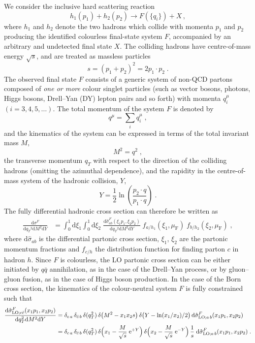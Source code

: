 \documentclass[12pt]{article}
\DeclareRobustCommand{\nn}{\nonumber}
\DeclareRobustCommand{\muf}{\ensuremath{\mu_{\mathrm{F}}}\xspace}
\DeclareRobustCommand{\qt}{\ensuremath{q_T}\xspace}
\DeclareRobustCommand{\rd}{\ensuremath{\mathrm{d}}}
\DeclareRobustCommand{\re}{\ensuremath{\mathrm{e}}}
\DeclareRobustCommand{\LO}{\text{LO}\xspace}
\begin{document}
We consider the inclusive hard scattering reaction 
\begin{equation}
  h_1(p_1)+h_2(p_2)\to F(\{q_i\})+X\, ,
  \label{class}
\end{equation}
where $h_1$ and $h_2$ denote the two hadrons which collide with momenta $p_1$ and $p_2$ producing the identified colourless final-state system $F$, accompanied by an arbitrary and undetected final state $X$. The colliding hadrons have centre-of-mass energy $\sqrt s$, and are treated as massless particles 
$$s= (p_1+p_2)^2 = 2p_1\cdot p_2 \;.$$ 
The observed final state $F$ consists of a generic system of non-QCD partons composed of \emph{one or more} colour singlet particles (such as vector bosons, photons, Higgs bosons, Drell--Yan (DY) lepton pairs and so forth) with momenta $q_i^{\mu}$ $(i=3,4,5,\dots)$. The total momentum of the system $F$ is denoted by 
$$q^{\mu}=\sum_i q_i^\mu \;,$$
and the kinematics of the system can be expressed in terms of the total invariant mass $M$, 
$$M^2=q^2 \;,$$ 
the transverse momentum $\qt$ with respect to the direction of the colliding hadrons (omitting the azimuthal dependence), and the rapidity in the centre-of-mass system of the hadronic collision, $Y$, 
$$Y = \frac{1}{2} \ln \left(\frac{p_2\cdot q}{p_1\cdot q}\right) \;.$$ 
The fully differential hadronic cross section can therefore be written as 
\begin{align}
  \frac{\rd\sigma^{F}}{\rd\qt^2\rd M^2\rd Y}
  &=
  \int_0^1\rd \xi_1 \int_0^1\rd \xi_2 \; 
  \frac{\rd\hat{\sigma}^{F}_{ab}(\xi_1 p_1, \xi_2 p_2)}{\rd\qt^2\rd M^2\rd Y} \;
  f_{a/h_1}(\xi_1,\muf) \; f_{b/h_2}(\xi_2,\muf) \;,
  \label{eq:hadXS_diff}
\end{align}
where $\rd\hat{\sigma}_{ab}$ is the differential partonic cross section, $\xi_1$, $\xi_2$ are the partonic momentum fractions and $f_{c/h}$ the distribution function for finding parton $c$ in hadron $h$.
Since $F$ is colourless, the LO partonic cross section can be either initiated by 
$q\bar{q}$ annihilation, as in the case of the Drell--Yan process, or by gluon--gluon fusion, as in the case of Higgs boson production.
In the case of the Born cross section, the kinematics of the colour-neutral system $F$ is fully constrained such that
\begin{align}
  \frac{\rd\hat{\sigma}^{F}_{\LO;c\bar{c}}(x_1 p_1, x_2 p_2)}{\rd\qt^2\rd M^2\rd Y}
  &=
  \delta_{c\,a} \, \delta_{\bar{c}\,b} \, 
  \delta(\qt^2) \,
  \delta\bigl(M^2-x_1 x_2 s\bigr) \,
  \delta\bigl(Y-\ln(x_1/x_2)/2\bigr) \,
  \rd\hat{\sigma}^{F}_{\LO;a\,b}(x_1 p_1, x_2 p_2)
  \nn\\
  &=
  \delta_{c\,a} \, \delta_{\bar{c}\,b} \, 
  \delta(\qt^2) \,
  \delta\Bigl(x_1-\frac{M}{\sqrt{s}}\;\re^{+Y}\Bigr) \,
  \delta\Bigl(x_2-\frac{M}{\sqrt{s}}\;\re^{-Y}\Bigr) \,
  \frac{1}{s} \;
  \rd\hat{\sigma}^{F}_{\LO;a\,b}(x_1 p_1, x_2 p_2) \;.
  \label{eq:LOpartXS_diff}
\end{align}
\end{document}
